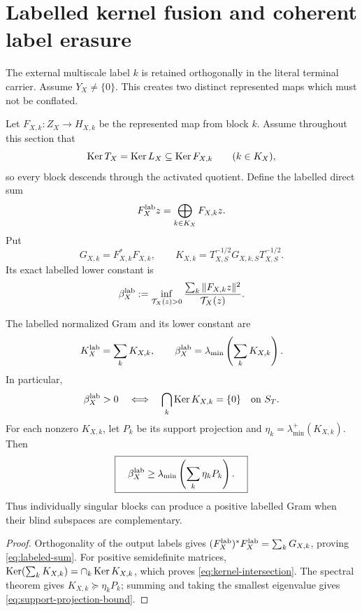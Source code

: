 \section{Labelled kernel fusion and coherent label erasure}

The external multiscale label \(k\) is retained orthogonally in the literal
terminal carrier. Assume \(Y_X\ne\{0\}\). This creates two distinct represented
maps which must not be conflated.

Let \(F_{X,k}:Z_X\to H_{X,k}\) be the represented map from block \(k\).
Assume throughout this section that
\begin{equation}\label{eq:block-descent}
 \operatorname{Ker} T_X=\operatorname{Ker} L_X\subseteq\operatorname{Ker} F_{X,k}
 \qquad(k\in K_X),
\end{equation}
so every block descends through the activated quotient. Define the labelled
direct sum
\[
 F_X^{\rm lab}z=\bigoplus_{k\in K_X}F_{X,k}z.
\]
Put
\[
 G_{X,k}=F_{X,k}^*F_{X,k},\qquad
 K_{X,k}=T_{X,S}^{-1/2}G_{X,k,S}T_{X,S}^{-1/2}.
\]
Its exact labelled lower constant is
\begin{equation}\label{eq:labeled-beta-definition}
 \beta_X^{\rm lab}
 :=\inf_{\mathcal T_X(z)>0}
 \frac{\sum_k\|F_{X,k}z\|^2}{\mathcal T_X(z)}.
\end{equation}

\begin{theorem}\label{thm:kernel-fusion}
The labelled normalized Gram and its lower constant are
\begin{equation}\label{eq:labeled-sum}
 K_X^{\rm lab}=\sum_kK_{X,k},\qquad
 \beta_X^{\rm lab}=\lambda_{\min}\left(\sum_kK_{X,k}\right).
\end{equation}
In particular,
\begin{equation}\label{eq:kernel-intersection}
 \beta_X^{\rm lab}>0
 \quad\Longleftrightarrow\quad
 \bigcap_k\operatorname{Ker} K_{X,k}=\{0\}
 \quad\text{on }S_T.
\end{equation}
For each nonzero \(K_{X,k}\), let \(P_k\) be its support projection and
\(\eta_k=\lambda_{\min}^+(K_{X,k})\). Then
\begin{equation}\label{eq:support-projection-bound}
 \boxed{\quad
 \beta_X^{\rm lab}
 \ge\lambda_{\min}\left(\sum_k\eta_kP_k\right).
 \quad}
\end{equation}
Thus individually singular blocks can produce a positive labelled Gram when
their blind subspaces are complementary.
\end{theorem}

\begin{proof}
Orthogonality of the output labels gives
\((F_X^{\rm lab})^*F_X^{\rm lab}=\sum_kG_{X,k}\), proving
\eqref{eq:labeled-sum}. For positive semidefinite matrices,
\(\operatorname{Ker}(\sum_kK_{X,k})=\cap_k\operatorname{Ker} K_{X,k}\), which proves
\eqref{eq:kernel-intersection}. The spectral theorem gives
\(K_{X,k}\succeq\eta_kP_k\); summing and taking the smallest eigenvalue gives
\eqref{eq:support-projection-bound}.
\end{proof}


